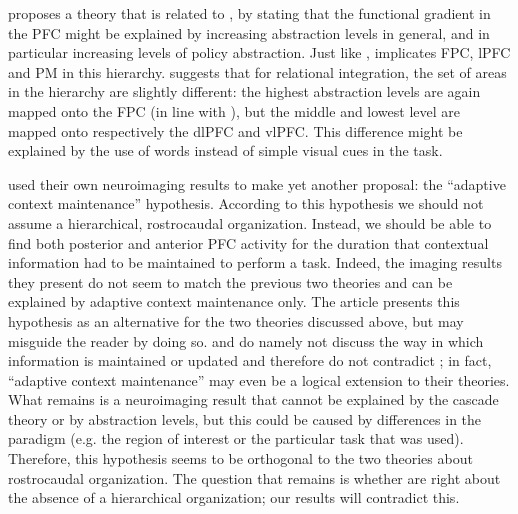 \documentclass[10pt,a4paper]{report}
\begin{document}
\citet{Badre2007} proposes a theory that is related to \citet{Koechlin2003}, by stating that the functional gradient in the PFC might be explained by increasing abstraction levels in general, and in particular increasing levels of policy abstraction. Just like \citet{Koechlin2003}, \citet{Badre2007} implicates FPC, lPFC and PM in this hierarchy. \citet{Christoff2009} suggests that for relational integration, the set of areas in the hierarchy are slightly different: the highest abstraction levels are again mapped onto the FPC (in line with \citet{Christoff2000}), but the middle and lowest level are mapped onto respectively the dlPFC and vlPFC. This difference might be explained by the use of words instead of simple visual cues in the task. 

\citet{Reynolds2012} used their own neuroimaging results to make yet another proposal: the ``adaptive context maintenance'' hypothesis. According to this hypothesis we should not assume a hierarchical, rostrocaudal organization. Instead, we should be able to find both posterior and anterior PFC activity for the duration that contextual information had to be maintained to perform a task. Indeed, the imaging results they present do not seem to match the previous two theories and can be explained by adaptive context maintenance only. The article presents this hypothesis as an alternative for the two theories discussed above, but may misguide the reader by doing so. \citet{Koechlin2003} and \citet{Badre2007} do namely not discuss the way in which information is maintained or updated and therefore do not contradict \citet{Reynolds2012}; in fact, ``adaptive context maintenance'' may even be a logical extension to their theories. What remains is a neuroimaging result that cannot be explained by the cascade theory or by abstraction levels, but this could be caused by differences in the paradigm (e.g. the region of interest or the particular task that was used). Therefore, this hypothesis seems to be orthogonal to the two theories about rostrocaudal organization. The question that remains is whether \citet{Reynolds2012} are right about the absence of a hierarchical organization; our results will contradict this.
\end{document}
